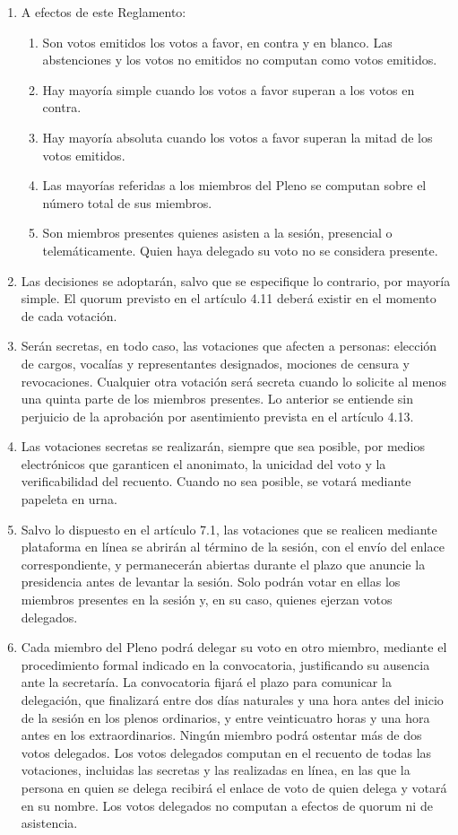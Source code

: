 \documentclass[11pt,a4paper]{article}
\begin{document}
\begin{enumerate}
\item A efectos de este Reglamento:
  \begin{enumerate}
    \item Son votos emitidos los votos a favor, en contra y en blanco. Las abstenciones y los votos no emitidos no computan como votos emitidos.
    \item Hay mayoría simple cuando los votos a favor superan a los votos en contra.
    \item Hay mayoría absoluta cuando los votos a favor superan la mitad de los votos emitidos.
    \item Las mayorías referidas a los miembros del Pleno se computan sobre el número total de sus miembros.
    \item Son miembros presentes quienes asisten a la sesión, presencial o telemáticamente. Quien haya delegado su voto no se considera presente.
  \end{enumerate}
\item Las decisiones se adoptarán, salvo que se especifique lo contrario, por mayoría simple. El quorum previsto en el artículo 4.11 deberá existir en el momento de cada votación.
\item Serán secretas, en todo caso, las votaciones que afecten a personas: elección de cargos, vocalías y representantes designados, mociones de censura y revocaciones. Cualquier otra votación será secreta cuando lo solicite al menos una quinta parte de los miembros presentes. Lo anterior se entiende sin perjuicio de la aprobación por asentimiento prevista en el artículo 4.13.
\item Las votaciones secretas se realizarán, siempre que sea posible, por medios electrónicos que garanticen el anonimato, la unicidad del voto y la verificabilidad del recuento. Cuando no sea posible, se votará mediante papeleta en urna.
\item Salvo lo dispuesto en el artículo 7.1, las votaciones que se realicen mediante plataforma en línea se abrirán al término de la sesión, con el envío del enlace correspondiente, y permanecerán abiertas durante el plazo que anuncie la presidencia antes de levantar la sesión. Solo podrán votar en ellas los miembros presentes en la sesión y, en su caso, quienes ejerzan votos delegados.
\item Cada miembro del Pleno podrá delegar su voto en otro miembro, mediante el procedimiento formal indicado en la convocatoria, justificando su ausencia ante la secretaría. La convocatoria fijará el plazo para comunicar la delegación, que finalizará entre dos días naturales y una hora antes del inicio de la sesión en los plenos ordinarios, y entre veinticuatro horas y una hora antes en los extraordinarios. Ningún miembro podrá ostentar más de dos votos delegados. Los votos delegados computan en el recuento de todas las votaciones, incluidas las secretas y las realizadas en línea, en las que la persona en quien se delega recibirá el enlace de voto de quien delega y votará en su nombre. Los votos delegados no computan a efectos de quorum ni de asistencia.
\end{enumerate}
\end{document}
